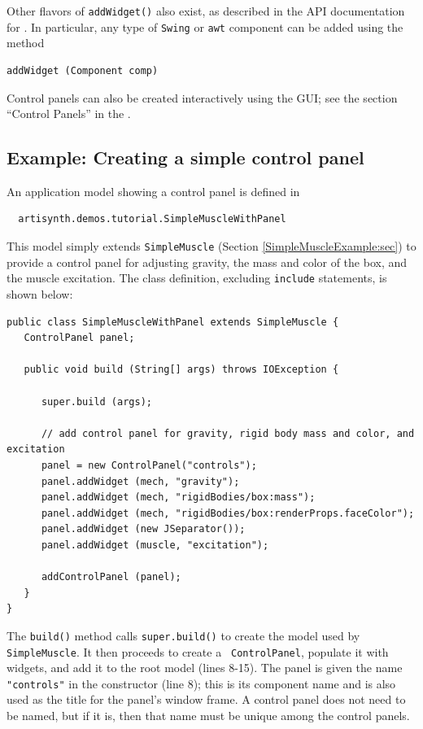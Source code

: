 Other flavors of {\tt addWidget()} also exist, as described in the API
documentation for .  In
particular, any type of {\tt Swing} or {\tt awt} component can be
added using the method
\begin{lstlisting}[]
   addWidget (Component comp)
\end{lstlisting}
%

\begin{sideblock}
Control panels can also be created interactively using the GUI; see
the section ``Control Panels'' in the\pdfbreak
{}.
\end{sideblock}

\subsection{Example: Creating a simple control panel}

An application model showing a control panel is defined in
%
\begin{verbatim}
  artisynth.demos.tutorial.SimpleMuscleWithPanel
\end{verbatim}
%
This model simply extends {\tt SimpleMuscle} (Section
\ref{SimpleMuscleExample:sec}) to provide a control panel for
adjusting gravity, the mass and color of the box, and the muscle
excitation. The class definition, excluding {\tt include} statements,
is shown below:
%
\lstset{numbers=left}
\begin{lstlisting}[]
public class SimpleMuscleWithPanel extends SimpleMuscle {
   ControlPanel panel;

   public void build (String[] args) throws IOException {

      super.build (args);

      // add control panel for gravity, rigid body mass and color, and excitation
      panel = new ControlPanel("controls");
      panel.addWidget (mech, "gravity");
      panel.addWidget (mech, "rigidBodies/box:mass");
      panel.addWidget (mech, "rigidBodies/box:renderProps.faceColor");
      panel.addWidget (new JSeparator());
      panel.addWidget (muscle, "excitation");

      addControlPanel (panel);
   }
}
\end{lstlisting}
\lstset{numbers=none}
%
The {\tt build()} method calls {\tt super.build()} to create the model
used by {\tt SimpleMuscle}. It then proceeds to create a {\tt
ControlPanel}, populate it with widgets, and add
it to the root model (lines 8-15). The panel is given the name {\tt
"controls"} in the constructor (line 8); this is its component name
and is also used as the title for the panel's window frame. A control
panel does not need to be named, but if it is, then that name must be
unique among the control panels.

